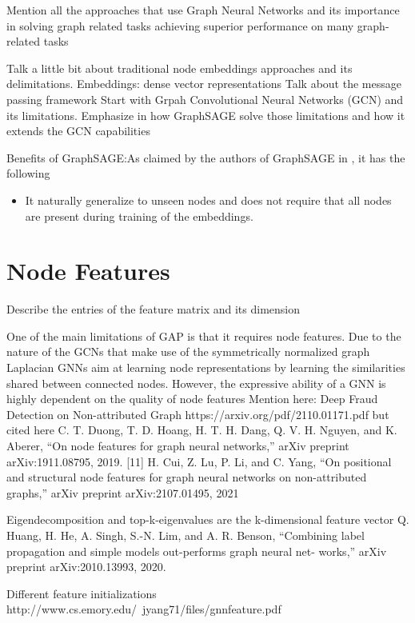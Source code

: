 Mention all the approaches that use Graph Neural Networks and its importance in solving graph related tasks
achieving superior performance on many graph-related tasks


Talk a little bit about traditional node embeddings approaches and its delimitations.
 Embeddings: dense vector representations
Talk about the message passing framework
Start with Grpah Convolutional Neural Networks (GCN) and its limitations. Emphasize in how GraphSAGE solve those limitations and how it extends the GCN capabilities

Benefits of GraphSAGE:As claimed by the authors of GraphSAGE in \citep{graphsage}, it has the following 
\begin{itemize}
\item It naturally generalize to unseen nodes and does not require that all nodes are present during training of the embeddings.
\end{itemize}

\section{Node Features}
Describe the entries of the feature matrix and its dimension

One of the main limitations of GAP is that it requires node features. Due to the nature of the GCNs that make use of the symmetrically normalized graph Laplacian
GNNs aim at learning node
representations by learning the similarities shared between
connected nodes. However, the expressive ability of a GNN
is highly dependent on the quality of node features
Mention here: Deep Fraud Detection on Non-attributed Graph
https://arxiv.org/pdf/2110.01171.pdf
but cited here
C. T. Duong, T. D. Hoang, H. T. H. Dang, Q. V. H. Nguyen, and
K. Aberer, “On node features for graph neural networks,” arXiv preprint
arXiv:1911.08795, 2019.
[11] H. Cui, Z. Lu, P. Li, and C. Yang, “On positional and structural node
features for graph neural networks on non-attributed graphs,” arXiv
preprint arXiv:2107.01495, 2021

Eigendecomposition and top-k-eigenvalues are the k-dimensional feature vector
Q. Huang, H. He, A. Singh, S.-N. Lim, and A. R. Benson, “Combining
label propagation and simple models out-performs graph neural net-
works,” arXiv preprint arXiv:2010.13993, 2020.

Different feature initializations
http://www.cs.emory.edu/~jyang71/files/gnnfeature.pdf

